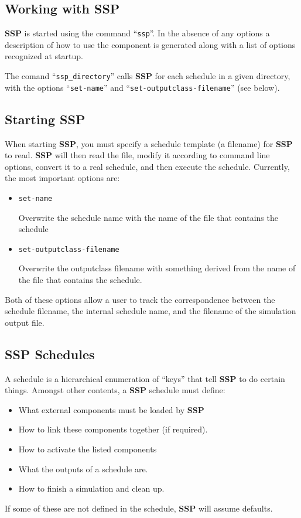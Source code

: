 \documentclass[12pt]{article}
\begin{document}
\subsection*{Working with SSP}

{\bf SSP} is started using the command ``{\tt ssp}''. In the absence of any options a description of how to use the component is generated along with a list of options recognized at startup.

The comand ``{\tt ssp\_directory}'' calls {\bf SSP} for each schedule in a given directory, with the options ``{\tt set-name}'' and ``{\tt set-outputclass-filename}'' (see below).

\subsection*{Starting SSP}

When starting {\bf SSP}, you must specify a schedule template (a filename) for {\bf SSP} to read. {\bf SSP} will then read the file, modify it according to command line options, convert it to a real schedule, and then execute the schedule. Currently, the most important options are:
\begin{itemize}
\item[ ]{\tt set-name}

Overwrite the schedule name with the name of the file that contains the schedule
\item[ ]{\tt set-outputclass-filename}

Overwrite the outputclass filename with something derived from the name of the file that contains the schedule.
\end{itemize}
Both of these options allow a user to track the correspondence between the schedule filename, the internal schedule name, and the filename of the simulation output file.

\subsection*{SSP Schedules}

A schedule is a hierarchical enumeration of ``keys'' that tell {\bf SSP} to do certain things. Amongst other contents, a {\bf SSP} schedule must define:
\begin{itemize}
\item What external components must be loaded by {\bf SSP}
\item How to link these components together (if required).
\item How to activate the listed components
\item What the outputs of a schedule are.
\item How to finish a simulation and clean up.
\end{itemize}
If some of these are not defined in the schedule, {\bf SSP} will assume defaults.
\end{document}
